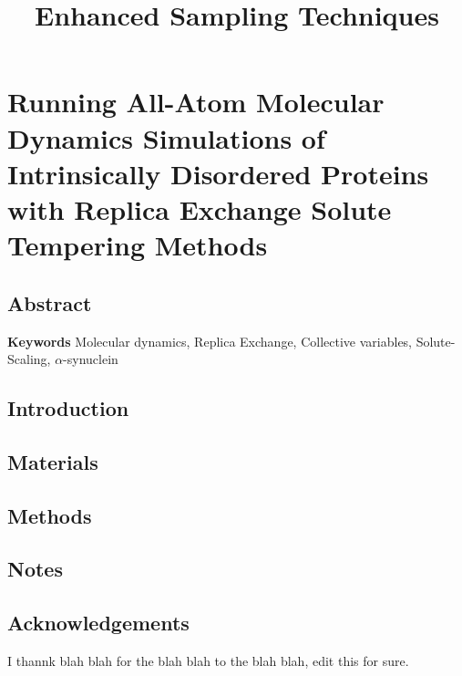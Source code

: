\documentclass{memoir}
\title{Enhanced Sampling Techniques}
\begin{document}
\date{}

\maketitle

\tableofcontents

\chapter{Running All-Atom Molecular Dynamics Simulations of Intrinsically Disordered Proteins with Replica Exchange Solute Tempering Methods}

\section{Abstract}


\textbf{Keywords} Molecular dynamics, Replica Exchange, Collective variables, Solute-Scaling, $\alpha$-synuclein

\section{Introduction}

    





\section{Materials}



\section{Methods}





\section{Notes}






\section{Acknowledgements}
I thannk blah blah for the blah blah to the blah blah, edit this for sure.



\end{document}
